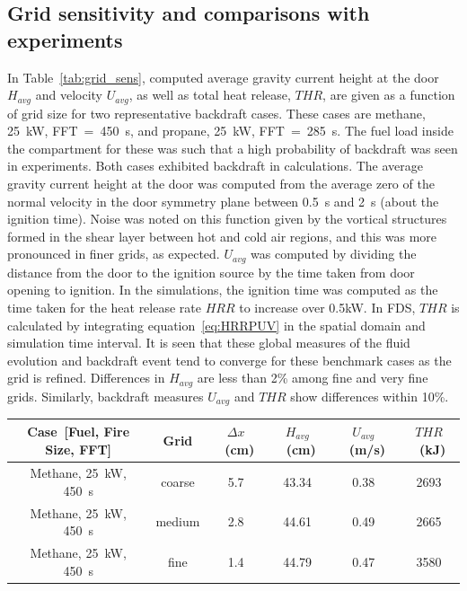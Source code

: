 \documentclass[12pt,letterpaper]{article}
\begin{document}
\begin{flushleft}
\section{Grid sensitivity and comparisons with experiments}
\label{sec:Grd_sens_exp}

In Table~\ref{tab:grid_sens}, computed average gravity current height at the door $H_{avg}$ and velocity $U_{avg}$, as well as total heat release, $THR$, are given as a function of grid size for two representative backdraft cases. These cases are methane, 25~kW, FFT~=~450~s, and propane, 25~kW, FFT~=~285~s. The fuel load inside the compartment for these was such that a high probability of backdraft was seen in experiments. Both cases exhibited backdraft in calculations. 
The average gravity current height at the door was computed from the average zero of the normal velocity in the door symmetry plane between 0.5~s and 2~s (about the ignition time). Noise was noted on this function given by the vortical structures formed in the shear layer between hot and cold air regions, and this was more pronounced in finer grids, as expected. $U_{avg}$ was computed by dividing the distance from the door to the ignition source by the time taken from door opening to ignition. In the simulations, the ignition time was computed as the time taken for the heat release rate $HRR$ to increase over 0.5kW. In FDS, $THR$ is calculated by integrating equation~\eqref{eq:HRRPUV} in the spatial domain and simulation time interval.
It is seen that these global measures of the fluid evolution and backdraft event tend to converge for these benchmark cases as the grid is refined. Differences in $H_{avg}$ are less than 2\% among fine and very fine grids. Similarly, backdraft measures $U_{avg}$ and $THR$ show differences within 10\%.
%
\begin{table}[]
    \centering
    \begin{tabular}{c|c|c|c|c|c}
    \hline
    Case~[Fuel, Fire Size, FFT]                & Grid         & $\Delta x$~(cm) & $H_{avg}$~(cm) & $U_{avg}$~(m/s) & $THR$~(kJ)   \\ %
    \hline
    Methane, 25~kW, 450~s & coarse   &           5.7 &      43.34        &     0.38      &   2693    \\ %
    Methane, 25~kW, 450~s & medium   &           2.8 &      44.61        &     0.49      &   2665    \\ %
    Methane, 25~kW, 450~s & fine     &           1.4 &      44.79        &     0.47      &   3580    \\ %

\end{tabular}
\end{table}
\end{flushleft}
\end{document}

